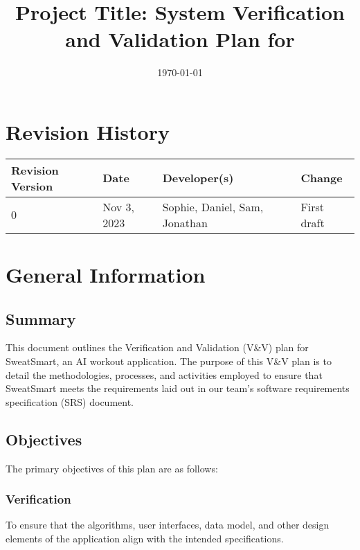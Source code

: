 \documentclass[12pt, titlepage]{article}
\begin{document}
\title{Project Title: System Verification and Validation Plan for \progname{}} 
\author{\authname}
\date{\today}
	
\maketitle


\section*{Revision History}

\begin{table}[hp]
		\centering
		\begin{tabularx}{\textwidth}{lllX}
			\toprule
			\textbf{Revision Version} & \textbf{Date} & \textbf{Developer(s)} & \textbf{Change}\\
			\midrule
			0 & Nov 3, 2023 & Sophie, Daniel, Sam, Jonathan & First draft\\
			\bottomrule
		\end{tabularx}
	\end{table}

\newpage

\tableofcontents

\listoftables


\newpage

\section{General Information}

\subsection{Summary}

This document outlines the Verification and Validation (V\&V) plan for SweatSmart, an AI workout application. The purpose of this V\&V plan is to detail the methodologies, processes, and activities employed to ensure that SweatSmart meets the requirements laid out in our team’s software requirements specification (SRS) document.

\subsection{Objectives}

The primary objectives of this plan are as follows:

\subsubsection{Verification}
To ensure that the algorithms, user interfaces, data model, and other design elements of the application align with the intended specifications.
\end{document}
